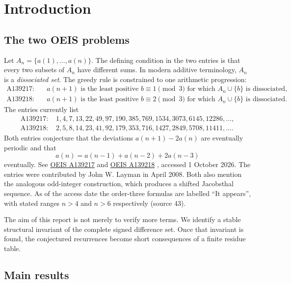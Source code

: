 \documentclass[11pt,a4paper]{article}
\numberwithin{equation}{section}
\theoremstyle{definition}
\theoremstyle{remark}
\theoremstyle{plain}
\newcommand{\oeis}[1]{\href{https://oeis.org/#1}{OEIS #1}}
\newcommand{\src}[1]{\textup{(source #1)}}
\begin{document}
\clearpage
\setcounter{tocdepth}{1}
\tableofcontents
\clearpage

\section{Introduction}\label{gdf:sec:intro}

\subsection{The two OEIS problems}

Let $A_n=\{a(1),\dots,a(n)\}$.  The defining condition in the two entries is
that every two subsets of $A_n$ have different sums.  In modern additive
terminology, $A_n$ is a \emph{dissociated set}.  The greedy rule is constrained
to one arithmetic progression:
\begin{align*}
\text{A139217:}&\quad a(n+1)\text{ is the least positive }b\equiv1\pmod3
\text{ for which }A_n\cup\{b\}\text{ is dissociated},\\
\text{A139218:}&\quad a(n+1)\text{ is the least positive }b\equiv2\pmod3
\text{ for which }A_n\cup\{b\}\text{ is dissociated}.
\end{align*}
The entries currently list
\begin{align*}
\text{A139217: }&1,4,7,13,22,49,97,190,385,769,1534,3073,6145,12286,\dots,\\
\text{A139218: }&2,5,8,14,23,41,92,179,353,716,1427,2849,5708,11411,\dots.
\end{align*}
Both entries conjecture that the deviations $a(n+1)-2a(n)$ are eventually
periodic and that
\begin{equation}\label{gdf:eq:common-recurrence}
 a(n)=a(n-1)+a(n-2)+2a(n-3)
\end{equation}
eventually.  See \oeis{A139217} and \oeis{A139218}
\cite{OEIS217,OEIS218}, accessed 1 October 2026.
The entries were contributed by John W. Layman in April 2008.  Both also
mention the analogous odd-integer construction, which produces a shifted
Jacobsthal sequence.  As of the access date the order-three formulas are
labelled ``It appears'', with stated ranges $n>4$ and $n>6$ respectively
\src{43}.

The aim of this report is not merely to verify more terms.  We identify a
stable structural invariant of the complete signed difference set.  Once that
invariant is found, the conjectured recurrences become short consequences of
a finite residue table.

\subsection{Main results}
\end{document}

